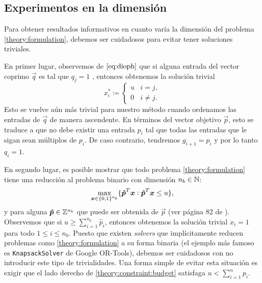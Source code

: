 \subsection{Experimentos en la dimensión}
\label{subsec:exp:fin:n}
\noindent
Para obtener resultados informativos en cuanto varía la dimensión del problema
\eqref{theory:formulation}, debemos ser cuidadosos para evitar tener soluciones triviales.

En primer lugar, observemos de $\eqref{eq:dioph}$ que si alguna entrada del vector coprimo $\vec{q}$
es tal que $q_j = 1$ , entonces obtenemos la solución trivial
\begin{equation*}
	x_i^* \coloneq \begin{cases}
		u & i = j, \\
		0 & i \neq j.
	\end{cases}
\end{equation*}
Esto se vuelve aún más trivial para nuestro método cuando ordenamos las entradas de $\vec{q}$ de
manera ascendente. En términos del vector objetivo $\vec{p}$, esto se traduce a que no debe existir una
entrada $p_i$ tal que todas las entradas que le sigan sean múltiplos de $p_i$. De caso contrario,
tendremos $g_{i + 1} = p_i$ y por lo tanto $q_i = 1$.

En segundo lugar, es posible mostrar que todo problema \eqref{theory:formulation} tiene una
reducción al problema binario con dimensión $n_b \in \mathbb{N}$:
\begin{equation*}
	\max_{\boldsymbol{x} \in \lbrace 0, 1 \rbrace^{n_b}} \lbrace  \boldsymbol{\hat{p}}^T\boldsymbol{x} \vcentcolon \boldsymbol{\hat{p}}^T\boldsymbol{x} \leq
	u \rbrace,
\end{equation*}
y para alguna $\boldsymbol{\hat{p}} \in \mathbb{Z}^{n_b}$ que puede ser obtenida de
$\vec{p}$ (ver página 82 de \cite{martello}). Observemos que si $u \geq
\sum_{i=1}^{n_b}\hat{p}_i$, entonces obtenemos la solución trivial $x_i = 1$ para todo $1 \leq i
\leq n_b$. Puesto que existen \textit{solvers} que implícitamente reducen problemas como
\eqref{theory:formulation} a su forma binaria (el ejemplo más famoso es \texttt{KnapsackSolver} de
Google OR-Tools), debemos ser cuidadosos con no introducir este tipo de trivialidades. Una forma simple
de evitar esta situación es exigir que el lado derecho de \eqref{theory:constraint:budget} satisfaga
$u < \sum_{i=1}^{n}p_i$.

